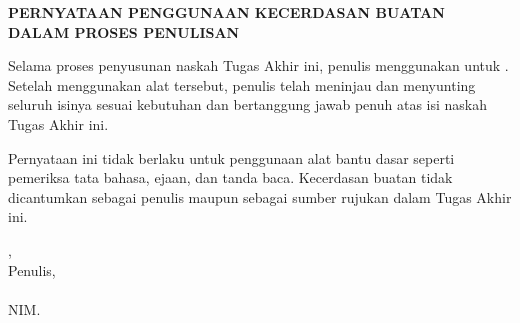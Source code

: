 %
%
%
\clearpage
{}
{}
\begin{center}
    \textbf{\large PERNYATAAN PENGGUNAAN KECERDASAN BUATAN}\\
    \textbf{\large DALAM PROSES PENULISAN}\\[2em]
\end{center}

Selama proses penyusunan naskah Tugas Akhir ini, penulis menggunakan
 untuk . Setelah menggunakan alat tersebut, penulis
telah meninjau dan menyunting seluruh isinya sesuai kebutuhan dan bertanggung
jawab penuh atas isi naskah Tugas Akhir ini.

\vspace{0.8em}
\noindent Pernyataan ini tidak berlaku untuk penggunaan alat bantu dasar seperti
pemeriksa tata bahasa, ejaan, dan tanda baca. Kecerdasan buatan tidak dicantumkan
sebagai penulis maupun sebagai sumber rujukan dalam Tugas Akhir ini.

\vspace{2em}
\begin{flushright}
    \kota, \tglpernyataan\\[0.8em]
    Penulis,\\[2cm]
    \penulis\\
    NIM. \nim
\end{flushright}
\clearpage
